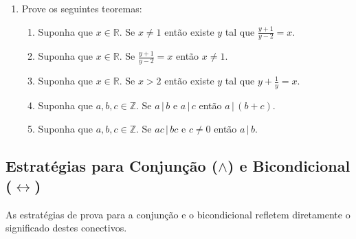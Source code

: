 \begin{enumerate}
  \item Prove os seguintes teoremas:
   \begin{enumerate}
     \item Suponha que $x\in\mathbb{R}$. Se $x\neq 1$ então existe $y$
       tal que $\frac{y+1}{y-2}= x$.
     \item Suponha que $x\in\mathbb{R}$. Se $\frac{y+1}{y-2}= x$ então
       $x\neq 1$.
     \item Suponha que $x\in\mathbb{R}$. Se $x > 2$ então existe $y$
       tal que $y + \frac{1}{y} = x$.
     \item Suponha que $a,b,c\in\mathbb{Z}$. Se $a\,|\,b$ e $a\,|\,c$ então
       $a\,|\,(b+c)$.
     \item Suponha que $a,b,c\in\mathbb{Z}$. Se $ac\,|\,bc$ e $c\neq
       0$ então $a\,|\,b$.
   \end{enumerate}
\end{enumerate}

\subsection{Estratégias para Conjunção ($\land$) e Bicondicional
  ($\leftrightarrow$)}

As estratégias de prova para a conjunção e o bicondicional refletem
diretamente o significado destes conectivos.

